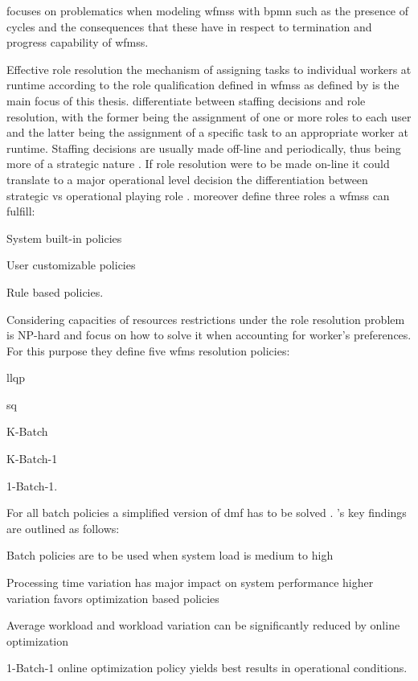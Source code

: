 \citet{Soerensen2005} focuses on problematics when modeling \glspl{wfms} with \gls{bpmn} such as the presence of cycles and the consequences that these have in respect to termination and progress capability of \glspl{wfms}.

Effective role resolution \ie the mechanism of assigning tasks to individual workers at runtime according to the role qualification defined in \glspl{wfms} as defined by \citet{Zeng2005} is the main focus of this thesis.
\citet{Zeng2005} differentiate between staffing decisions and role resolution, with the former being the assignment of one or more roles to each user and the latter being the assignment of a specific task to an appropriate worker at runtime. Staffing decisions are usually made off-line and periodically, thus being more of a strategic nature \citep{Zeng2005}. If role resolution were to be made on-line it could translate to a major operational level decision \ie the differentiation between strategic vs operational playing role \citep{Zeng2005}.
\citet{Zeng2005} moreover define three roles a \glspl{wfms} can fulfill:
\begin{enumerate*}
	\item System built-in policies
	\item User customizable policies
	\item Rule based policies.
\end{enumerate*}
Considering capacities of resources restrictions under the role resolution problem is NP-hard and \citet{Zeng2005} focus on how to solve it when accounting for worker's preferences. For this purpose they define five \gls{wfms} resolution policies:
\begin{enumerate*}
	\item \gls{llqp}
	\item \gls{sq}
	\item K-Batch
	\item K-Batch-1
	\item 1-Batch-1.
\end{enumerate*}
For all batch policies a simplified version of \gls{dmf} has to be solved \citep{Zeng2005}.
\citet{Zeng2005}'s key findings are outlined as follows:
\begin{enumerate*}
	\item Batch policies are to be used when system load is medium to high
	\item Processing time variation has major impact on system performance \ie higher variation favors optimization based policies
	\item Average workload and workload variation can be significantly reduced by online optimization
	\item 1-Batch-1 online optimization policy yields best results in operational conditions.
\end{enumerate*}

